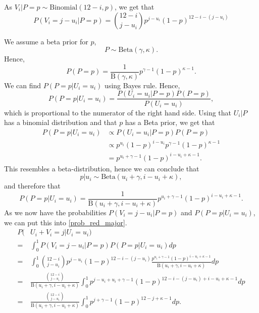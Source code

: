 \documentclass{article}
\begin{document}
As $V_i|P=p \sim \text{Binomial}(12-i,p)$, we get that 
\begin{equation*}
    P(V_i=j-u_i|P=p)=\binom{12-i}{j-u_i}p^{j-u_i}(1-p)^{12-i-(j-u_i)}
\end{equation*}

We assume a beta prior for $p$,
\begin{equation*}
    P \sim \text{Beta}(\gamma,\kappa).
\end{equation*}
Hence,
\begin{equation*}
    P(P=p) = \frac{1}{\text{B}(\gamma,\kappa)}p^{\gamma-1}(1-p)^{\kappa-1}.
\end{equation*}
We can find $P(P=p| U_i=u_i)$ using Bayes rule. Hence,
\begin{equation*}
    P(P=p| U_i=u_i) = \frac{P(U_i=u_i|P=p)P(P=p)}{P(U_i=u_i)},
\end{equation*}
which is proportional to the numerator of the right hand side. Using that $U_i|P$ has a binomial distribution and that $p$ has a Beta prior, we get that
\begin{equation*}
    \begin{aligned}
        P(P=p|U_i=u_i) 
        &\propto P(U_i=u_i|P=p)P(P=p)\\[6pt] 
        &\propto p^{u_i}(1-p)^{i-u_i}p^{\gamma-1}(1-p)^{\kappa-1}\\[6pt]
        &= p^{u_i+\gamma-1}(1-p)^{i-u_i+\kappa-1}.
    \end{aligned}
\end{equation*}
This resembles a beta-distribution, hence we can conclude that
\begin{equation*}
    p|u_i \sim \text{Beta}(u_i+\gamma,i-u_i+\kappa),
\end{equation*}
and therefore that 
\begin{equation*}
    P(P=p|U_i=u_i) = \frac{1}{\text{B}(u_i+\gamma,i-u_i+\kappa)}p^{u_i+\gamma-1}(1-p)^{i-u_i+\kappa-1}.
\end{equation*}
As we now have the probabilities $P(V_i=j-u_i|P=p)$ and $P(P=p|U_i=u_i)$, we can put this into \eqref{prob_red_major}.
\begin{equation}
\label{red_12_equal_j}
    \begin{aligned}
         P(&U_i+V_i = j | U_i=u_i) \\[6pt]
        =& \int_0^1 P(V_i = j-u_i | P=p) P(P=p| U_i=u_i) dp \\[6pt]
        =& \int_0^1 \binom{12-i}{j-u_i}p^{j-u_i}(1-p)^{12-i-(j-u_i)} \frac{p^{u_i+\gamma-1}(1-p)^{i-u_i+\kappa-1}}{\text{B}(u_i+\gamma,i-u_i+\kappa)} dp\\[6pt]
        =& \frac{\binom{12-i}{j-u_i}}{\text{B}(u_i+\gamma,i-u_i+\kappa)} \int_0^1 
        p^{j-u_i+u_i+\gamma-1}(1-p)^{12-i-(j-u_i)+i-u_i+\kappa-1} dp\\[6pt]
        =& \frac{\binom{12-i}{j-u_i}}{\text{B}(u_i+\gamma,i-u_i+\kappa)} \int_0^1 
        p^{j+\gamma-1}(1-p)^{12-j+\kappa-1} dp.
    \end{aligned}
\end{equation}
\end{document}
